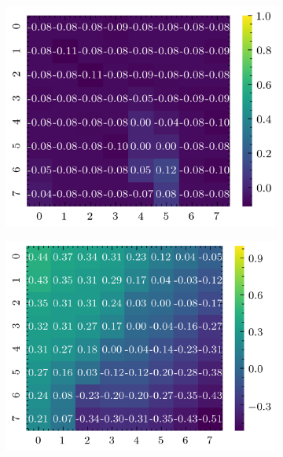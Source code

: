 \begin{figure}[H]
\begin{subfigure}[b]{0.19\textwidth}
        \includegraphics[width=\linewidth]{../img/5/quarry/false_negative/heatmap-2d-2.png}
    \end{subfigure}
    \begin{subfigure}[b]{0.19\textwidth}
        \includegraphics[width=\linewidth]{../img/5/quarry/false_negative/heatmap-2d-3.png}
    \end{subfigure}  
    \begin{subfigure}[b]{0.19\textwidth}

\end{subfigure}
\end{figure}
